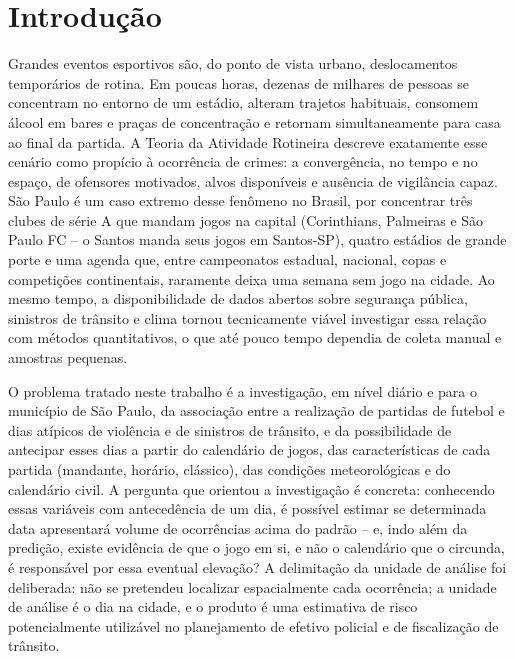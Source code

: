 \documentclass[12pt]{article}
\begin{document}
\tableofcontents

\section{Introdução}

Grandes eventos esportivos são, do ponto de vista urbano, deslocamentos
temporários de rotina. Em poucas horas, dezenas de milhares de pessoas se
concentram no entorno de um estádio, alteram trajetos habituais, consomem
álcool em bares e praças de concentração e retornam simultaneamente para
casa ao final da partida. A Teoria da Atividade Rotineira \cite{cohen1979}
descreve exatamente esse cenário como propício à ocorrência de crimes: a
convergência, no tempo e no espaço, de ofensores motivados, alvos
disponíveis e ausência de vigilância capaz. São Paulo é um caso extremo
desse fenômeno no Brasil, por concentrar três clubes de série A que mandam
jogos na capital (Corinthians, Palmeiras e São Paulo FC -- o Santos manda
seus jogos em Santos-SP), quatro estádios de grande porte e uma agenda
que, entre campeonatos estadual, nacional, copas e competições
continentais, raramente deixa uma semana sem jogo na cidade. Ao mesmo
tempo, a disponibilidade de dados abertos sobre segurança pública,
sinistros de trânsito e clima tornou tecnicamente viável investigar essa
relação com métodos quantitativos, o que até pouco tempo dependia de
coleta manual e amostras pequenas.

O problema tratado neste trabalho é a investigação, em nível diário e
para o município de São Paulo, da associação entre a realização de
partidas de futebol e dias atípicos de violência e de sinistros de
trânsito, e da possibilidade de antecipar esses dias a partir do
calendário de jogos, das características de cada partida (mandante,
horário, clássico), das condições meteorológicas e do calendário civil. A
pergunta que orientou a investigação é concreta: conhecendo essas
variáveis com antecedência de um dia, é possível estimar se determinada
data apresentará volume de ocorrências acima do padrão -- e, indo além da
predição, existe evidência de que o jogo em si, e não o calendário que o
circunda, é responsável por essa eventual elevação? A delimitação da
unidade de análise foi deliberada: não se pretendeu localizar
espacialmente cada ocorrência; a unidade de análise é o dia na cidade, e
o produto é uma estimativa de risco potencialmente utilizável no
planejamento de efetivo policial e de fiscalização de trânsito.
\end{document}
